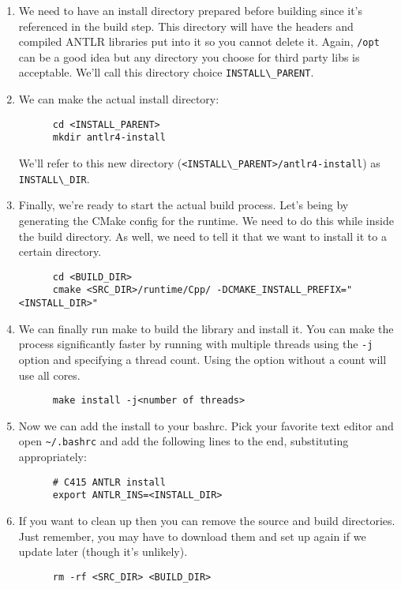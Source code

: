 \documentclass{article}
\begin{document}
\begin{enumerate}
  \item
    We need to have an install directory prepared before building since it's referenced in the
    build step. This directory will have the headers and compiled ANTLR libraries put into it so
    you cannot delete it. Again, \lstinline{/opt} can be a good idea but any directory you choose
    for third party libs is acceptable. We'll call this directory choice
    \lstinline{INSTALL\_PARENT}.
  \item
    We can make the actual install directory:
    \begin{lstlisting}
      cd <INSTALL_PARENT>
      mkdir antlr4-install
    \end{lstlisting}
    We'll refer to this new directory (\lstinline{<INSTALL\_PARENT>/antlr4-install}) as
    \lstinline{INSTALL\_DIR}.
  \item
    Finally, we're ready to start the actual build process. Let's being by generating the CMake
    config for the runtime. We need to do this while inside the build directory. As well, we need
    to tell it that we want to install it to a certain directory.
    \begin{lstlisting}
      cd <BUILD_DIR>
      cmake <SRC_DIR>/runtime/Cpp/ -DCMAKE_INSTALL_PREFIX="<INSTALL_DIR>"
    \end{lstlisting}
  \item
    We can finally run make to build the library and install it. You can make the process
    significantly faster by running with multiple threads using the \lstinline{-j} option and
    specifying a thread count. Using the option without a count will use all cores.
    \begin{lstlisting}
      make install -j<number of threads>
    \end{lstlisting}
  \item
    Now we can add the install to your bashrc. Pick your favorite text editor and open
    \lstinline{~/.bashrc} and add the following lines to the end, substituting appropriately:
    \begin{lstlisting}
      # C415 ANTLR install
      export ANTLR_INS=<INSTALL_DIR>
    \end{lstlisting}
  \item
    If you want to clean up then you can remove the source and build directories. Just remember,
    you may have to download them and set up again if we update later (though it's unlikely).
    \begin{lstlisting}
      rm -rf <SRC_DIR> <BUILD_DIR>
    \end{lstlisting}
\end{enumerate}
\end{document}
